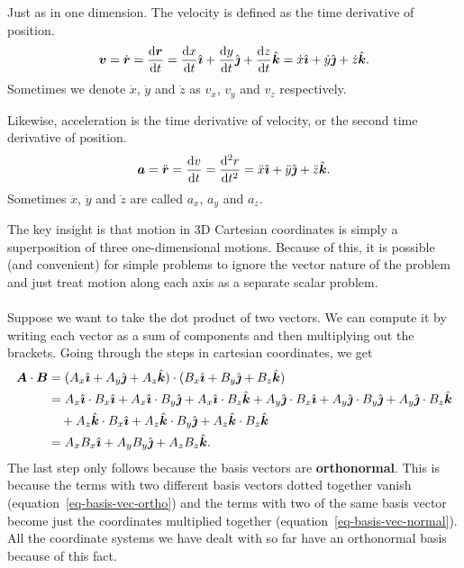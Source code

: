 \documentclass[../classical_mechanics.tex]{subfiles}
\begin{document}
        \begin{definition}
            Just as in one dimension.
            The velocity is defined as the time derivative of position.
            \begin{equation}
                \vec{v}=\dot{\vec{r}}=\dv{\vec{r}}{t}=\dv{x}{t}\ihat+\dv{y}{t}\jhat+\dv{z}{t}\khat=\dot{x}\ihat+\dot{y}\jhat+\dot{z}\khat.
            \end{equation}
            Sometimes we denote $\dot{x}$, $\dot{y}$ and $\dot{z}$ as $v_x$, $v_y$ and $v_z$ respectively.
        \end{definition}
        \begin{definition}
            Likewise, acceleration is the time derivative of velocity, or the second time derivative of position.
            \begin{equation}
                \vec{a}=\ddot{\vec{r}}=\dv{v}{t}=\dv[2]{r}{t}=\ddot{x}\ihat+\ddot{y}\jhat+\ddot{z}\khat.
            \end{equation}
            Sometimes $\ddot{x}$, $\ddot{y}$ and $\ddot{z}$ are called $a_x$, $a_y$ and $a_z$.
        \end{definition}
        The key insight is that motion in 3D Cartesian coordinates is simply a superposition of three one-dimensional motions.
        Because of this, it is possible (and convenient) for simple problems to ignore the vector nature of the problem and just treat motion along each axis as a separate scalar problem.
        
        \paragraph{}
        Suppose we want to take the dot product of two vectors.
        We can compute it by writing each vector as a sum of components and then multiplying out the brackets.
        Going through the steps in cartesian coordinates, we get
        \begin{align}
            \boldsymbol{A}\cdot\boldsymbol{B}&=(A_x\hat{\boldsymbol{\imath}}+A_y\hat{\boldsymbol{\jmath}}+A_z\hat{\boldsymbol{k}})\cdot(B_x\hat{\boldsymbol{\imath}}+B_y\hat{\boldsymbol{\jmath}}+B_z\hat{\boldsymbol{k}})\\
            &\begin{aligned}
                &=A_x\hat{\boldsymbol{\imath}}\cdot B_x\hat{\boldsymbol{\imath}}+A_x\hat{\boldsymbol{\imath}}\cdot B_y\hat{\boldsymbol{\jmath}}+A_x\hat{\boldsymbol{\imath}}\cdot B_z\hat{\boldsymbol{k}}+A_y\hat{\boldsymbol{\jmath}}\cdot B_x\hat{\boldsymbol{\imath}}+A_y\hat{\boldsymbol{\jmath}}\cdot B_y\hat{\boldsymbol{\jmath}}+A_y\hat{\boldsymbol{\jmath}}\cdot B_z\hat{\boldsymbol{k}}\\
                &\quad+A_z\hat{\boldsymbol{k}}\cdot B_x\hat{\boldsymbol{\imath}}+A_z\hat{\boldsymbol{k}}\cdot B_y\hat{\boldsymbol{\jmath}}+A_z\hat{\boldsymbol{k}}\cdot B_z\hat{\boldsymbol{k}}
            \end{aligned}\\
            &=A_xB_x\hat{\boldsymbol{\imath}}+A_yB_y\hat{\boldsymbol{\jmath}}+A_zB_z\hat{\boldsymbol{k}}.
        \end{align}
        The last step only follows because the basis vectors are \textbf{orthonormal}.
        This is because the terms with two different basis vectors dotted together vanish (equation~\ref{eq-basis-vec-ortho}) and the terms with two of the same basis vector become just the coordinates multiplied together (equation~\ref{eq-basis-vec-normal}).
        All the coordinate systems we have dealt with so far have an orthonormal basis because of this fact.
\end{document}
